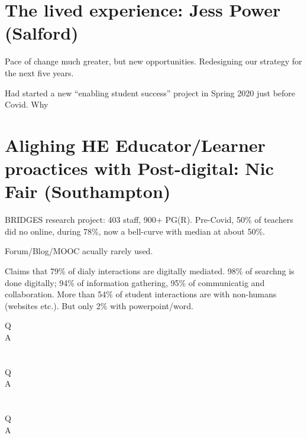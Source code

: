 \documentclass{article}
\begin{document}
\section{The lived experience: Jess Power (Salford)}
Pace of change much greater, but new opportunities. Redesigning our strategy for the next five years.
\par
Had started a new ``enabling student success'' project in Spring 2020 just before Covid. Why 
\section{Alighing HE Educator/Learner proactices with Post-digital: Nic Fair (Southampton)}
BRIDGES research project: 403 staff, 900+ PG(R). Pre-Covid, 50\% of teachers did no online, during 78\%, now a bell-curve with median at about 50\%.
\par
Forum/Blog/MOOC acually rarely used.
\par
Claims that 79\% of dialy interactions are digitally mediated. 98\% of searchng is done digitally; 94\% of information gathering, 95\% of communicatig and collaboration. More than 54\% of student interactions are with non-humans (websites etc.). But only 2\% with powerpoint/word.
\begin{description}
\item[Q]
\item[A]
\end{description}
\section{}
\begin{description}
\item[Q]
\item[A]
\end{description}
\section{}

\section{}
\begin{description}
\item[Q]
\item[A]
\end{description}
\begin{description}
\item[]
\end{description}

\end{document}
